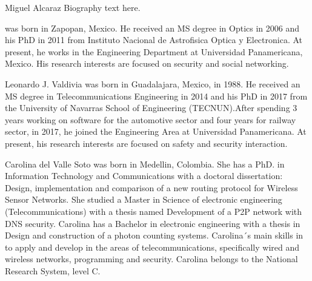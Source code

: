 \begin{IEEEbiographynophoto}{Miguel Alcaraz}
Biography text here.
\end{IEEEbiographynophoto}
was born in Zapopan, Mexico. He received an MS degree in Optics in 2006 and his PhD in 2011 from Instituto Nacional de Astrofisica Optica y Electronica. At present, he works in the Engineering Department at Universidad Panamericana, Mexico. His research interests are focused on security and social networking.

\begin{IEEEbiographynophoto}{Leonardo J. Valdivia}
was born in Guadalajara, Mexico, in 1988. He received an MS degree in Telecommunications Engineering in 2014 and his PhD in 2017 from the University of Navarras School of Engineering (TECNUN).After spending 3 years working on software for the automotive sector and four years for railway sector, in 2017, he joined the Engineering Area at Universidad Panamericana. At present, his research interests are focused on safety and security interaction.
\end{IEEEbiographynophoto}


\begin{IEEEbiographynophoto}{Carolina del Valle Soto}
was born in Medellin, Colombia. She has a PhD. in Information Technology and Communications with a doctoral dissertation: Design, implementation and comparison of a new routing protocol for Wireless Sensor Networks. She studied a Master in Science of electronic engineering (Telecommunications) with a thesis named Development of a P2P network with DNS security. Carolina has a Bachelor in electronic engineering with a thesis in Design and construction of a photon counting systems. Carolina´s main skills in to apply and develop in the areas of telecommunications, specifically wired and wireless networks, programming and security. Carolina belongs to the National Research System, level C.
\end{IEEEbiographynophoto}







